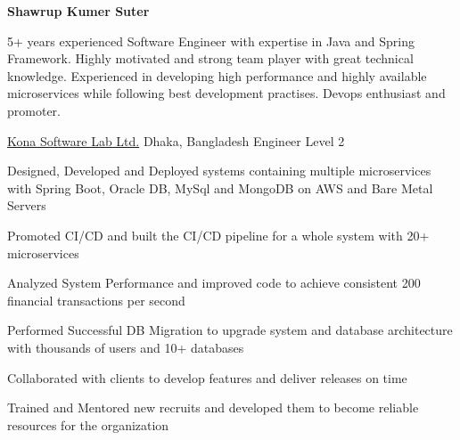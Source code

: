 \documentclass[10pt]{article}
\begin{document}
	
\begin{center}
	\textbf{\LARGE Shawrup Kumer Suter}\\[0.5ex]
\end{center}

\spacedhrule{-1.0ex}{-0.5ex}
5+ years experienced Software Engineer with expertise in Java and Spring Framework. Highly motivated and strong team player with great technical knowledge. Experienced in developing high performance and highly available microservices while following best development practises. Devops enthusiast and promoter.
\spacedhrule{0.8ex}{0.0ex}


\headedsection
{\href{https://konasl.com/}{Kona Software Lab Ltd.}}
{Dhaka, Bangladesh}
{Engineer Level 2}
{}{
\vspace{-2.4ex}
\begin{circlist}	
	\item Designed, Developed and Deployed systems containing multiple microservices with Spring Boot, Oracle DB, MySql and MongoDB on AWS and Bare Metal Servers
	\item Promoted CI/CD and built the CI/CD pipeline for a whole system with 20+ microservices
	\item Analyzed System Performance and improved code to achieve consistent 200 financial transactions per second
	\item Performed Successful DB Migration to upgrade system and database architecture with thousands of users and 10+ databases
	\item Collaborated with clients to develop features and deliver releases on time
	\item Trained and Mentored new recruits and developed them to become reliable resources for the organization
\end{circlist}
}
\end{document}
